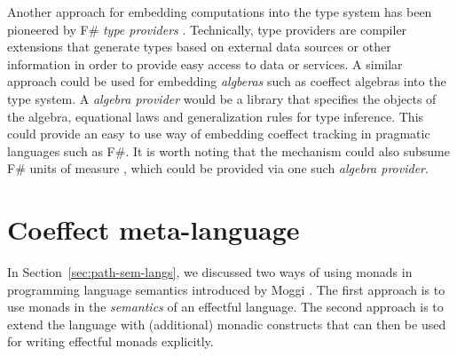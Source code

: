 Another approach for embedding computations into the type system has been pioneered by F\#
\emph{type providers} \cite{app-inforich}. Technically, type providers are compiler extensions 
that generate types based on external data sources or other information in order to provide easy 
access to data or services. A similar approach could be used for embedding \emph{algberas} such
as coeffect algebras into the type system. A \emph{algebra provider} would be a library that 
specifies the objects of the algebra, equational laws and generalization rules for type inference.
This could provide an easy to use way of embedding coeffect tracking in pragmatic languages
such as F\#. It is worth noting that the mechanism could also subsume F\# units of measure
\cite{types-units-of-measure}, which could be provided via one such \emph{algebra provider}.



%                                                                                             

\section{Coeffect meta-language}
\label{sec:unified-meta} 

In Section~\ref{sec:path-sem-langs}, we discussed two ways of using monads in programming
language semantics introduced by Moggi \cite{monad-notions}. The first approach is to use
monads in the \emph{semantics} of an effectful language. The second approach is to extend the
language with (additional) monadic constructs that can then be used for writing effectful
monads explicitly.

